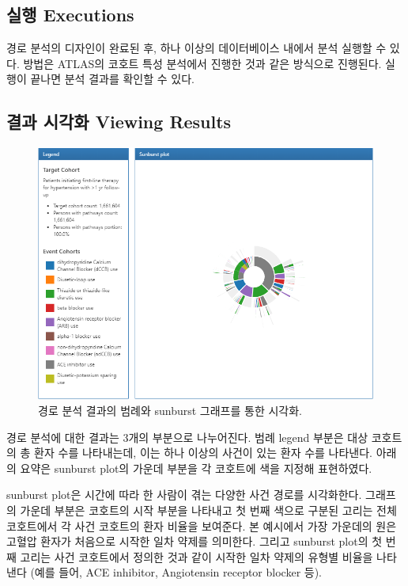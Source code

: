 \documentclass[11pt]{book}
\theoremstyle{definition}
\theoremstyle{definition}
\theoremstyle{definition}
\theoremstyle{remark}
\begin{document}
\subsection{실행 Executions}\label{-executions}

경로 분석의 디자인이 완료된 후, 하나 이상의 데이터베이스 내에서 분석
실행할 수 있다. 방법은 ATLAS의 코호트 특성 분석에서 진행한 것과 같은
방식으로 진행된다. 실행이 끝나면 분석 결과를 확인할 수 있다.

\subsection{결과 시각화 Viewing Results}\label{--viewing-results}

\begin{figure}

{\centering \includegraphics[width=1\linewidth]{images/Characterization/atlasPathwaysResults} 

}

\caption{경로 분석 결과의 범례와 sunburst 그래프를 통한 시각화.}\label{fig:atlasPathwaysResults}
\end{figure}

경로 분석에 대한 결과는 3개의 부분으로 나누어진다. 범례 legend 부분은
대상 코호트의 총 환자 수를 나타내는데, 이는 하나 이상의 사건이 있는 환자
수를 나타낸다. 아래의 요약은 sunburst plot의 가운데 부분을 각 코호트에
색을 지정해 표현하였다.

sunburst plot은 시간에 따라 한 사람이 겪는 다양한 사건 경로를
시각화한다. 그래프의 가운데 부분은 코호트의 시작 부분을 나타내고 첫 번째
색으로 구분된 고리는 전체 코호트에서 각 사건 코호트의 환자 비율을
보여준다. 본 예시에서 가장 가운데의 원은 고혈압 환자가 처음으로 시작한
일차 약제를 의미한다. 그리고 sunburst plot의 첫 번째 고리는 사건
코호트에서 정의한 것과 같이 시작한 일차 약제의 유형별 비율을 나타낸다
(예를 들어, ACE inhibitor, Angiotensin receptor blocker 등).
\end{document}
